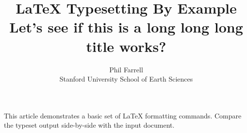 

\title{LaTeX Typesetting By Example Let's see if this is a long long long title works?}
\author{Phil Farrell\\
Stanford University School of Earth Sciences}
\renewcommand{\today}{November 2, 1994}
\maketitle
This article demonstrates a basic set of LaTeX formatting commands.
Compare the typeset output side-by-side with the input document.

